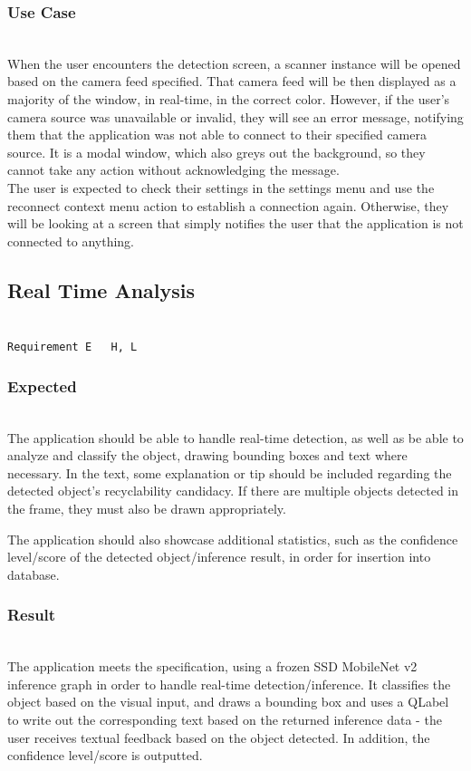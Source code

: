 \documentclass[conference]{IEEEtran}
\begin{document}
\subsubsection{Use Case}~\\
When the user encounters the detection screen, a scanner instance will be opened based on the camera feed specified. That camera feed will be then displayed as a majority of the window, in real-time, in the correct color. However, if the user's camera source was unavailable or invalid, they will see an error message, notifying them that the application was not able to connect to their specified camera source. It is a modal window, which also greys out the background, so they cannot take any action without acknowledging the message. \\

The user is expected to check their settings in the settings menu and use the reconnect context menu action to establish a connection again. Otherwise, they will be looking at a screen that simply notifies the user that the application is not connected to anything.~\\

\subsection{Real Time Analysis}~\\
\texttt{Requirement E ~ H, L}~\\
\subsubsection{Expected}~\\
The application should be able to handle real-time detection, as well as be able to analyze and classify the object, drawing bounding boxes and text where necessary. In the text, some explanation or tip should be included regarding the detected object's recyclability candidacy. If there are multiple objects detected in the frame, they must also be drawn appropriately.

The application should also showcase additional statistics, such as the confidence level/score of the detected object/inference result, in order for insertion into database.~\\

\subsubsection{Result}~\\
The application meets the specification, using a frozen SSD MobileNet v2 inference graph in order to handle real-time detection/inference. It classifies the object based on the visual input, and draws a bounding box and uses a QLabel to write out the corresponding text based on the returned inference data - the user receives textual feedback based on the object detected. In addition, the confidence level/score is outputted.\\
\end{document}
